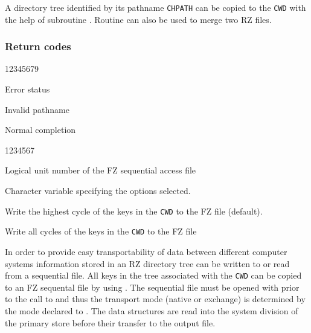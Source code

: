 A directory tree identified by its
pathname {\tt CHPATH} can be copied
to the {\tt CWD} with the help of subroutine .
Routine  can also be used to merge two RZ files.

\subsubsection*{Return codes}
\begin{DLtt}{12345679}
\item[IQUEST(1)]Error status
\begin{DLtt}{1}
\item[1]Invalid pathname
\item[0]Normal completion
\end{DLtt}
\end{DLtt}



\begin{DLtt}{1234567}
\item[LUNFZ]Logical unit number of the FZ sequential access file
\item[CHOPT]Character variable specifying the options selected.
\begin{DLtt}{12}
\item[' ']Write the highest cycle of the keys in the {\tt CWD}
to the FZ file (default).
\item['C']Write all cycles of the keys in the {\tt CWD} to the FZ file
\end{DLtt}
\end{DLtt}

In order to provide
easy transportability of data between different computer
systems information stored in an RZ directory tree can
be written to or read from a sequential file.
All keys in the tree associated with the {\tt CWD} can be copied
to an FZ sequental file by using .
The sequential file must be opened with  prior to
the call to  and thus the transport mode (native or exchange)
is determined by the mode declared to .
The data structures are read into the system division of the
primary store before their transfer to the output file.

